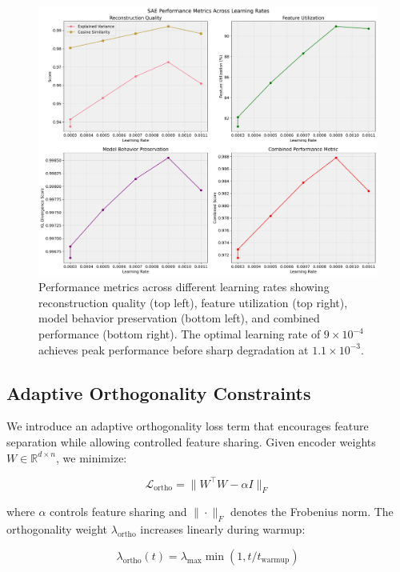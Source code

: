 \documentclass{article} %
\begin{document}
\begin{figure}[t]
    \centering
    \includegraphics[width=\textwidth]{sae_performance_metrics.png}
    \caption{Performance metrics across different learning rates showing reconstruction quality (top left), feature utilization (top right), model behavior preservation (bottom left), and combined performance (bottom right). The optimal learning rate of $9 \times 10^{-4}$ achieves peak performance before sharp degradation at $1.1 \times 10^{-3}$.}
    \label{fig:performance_metrics}
\end{figure}

\subsection{Adaptive Orthogonality Constraints}
We introduce an adaptive orthogonality loss term that encourages feature separation while allowing controlled feature sharing. Given encoder weights $W \in \mathbb{R}^{d \times n}$, we minimize:

\begin{equation}
    \mathcal{L}_{\text{ortho}} = \|W^{\top}W - \alpha I\|_F
\end{equation}

where $\alpha$ controls feature sharing and $\|\cdot\|_F$ denotes the Frobenius norm. The orthogonality weight $\lambda_{\text{ortho}}$ increases linearly during warmup:

\begin{equation}
    \lambda_{\text{ortho}}(t) = \lambda_{\text{max}} \min(1, t/t_{\text{warmup}})
\end{equation}
\end{document}
